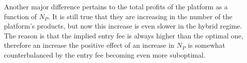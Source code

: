 \documentclass[a4paper]{article}
\begin{document}
Another major difference pertains to the total profits of the platform as a function of $N_P$.
It is still true that they are increasing in the number of the platform's products, but now this increase is even slower in the hybrid regime.
The reason is that the implied entry fee is always higher than the optimal one, therefore an increase the positive effect of an increase in $N_P$ is somewhat counterbalanced by the entry fee becoming even more suboptimal.


\begin{figure}
    \centering
    \begin{subfigure}[b]{0.45\textwidth}
        \centering
\end{subfigure}
\end{figure}
\end{document}

